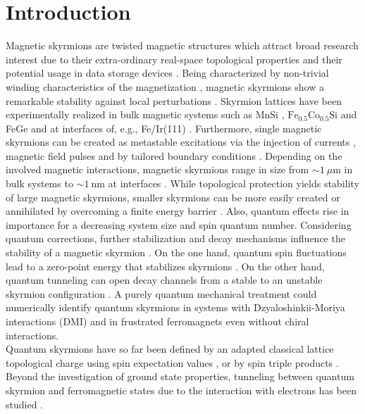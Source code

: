 \documentclass[reprint,aps,prb,superscriptaddress,10pt]{revtex4-2} %
\begin{document}
\section{Introduction}
Magnetic skyrmions \cite{Bogdanov1989} are twisted magnetic structures which attract broad research interest due to their extra-ordinary real-space topological properties \cite{Nagaosa2013} and their potential usage in data storage devices \cite{Kiselev2011,Fert2017,Back2020}.
Being characterized by non-trivial winding characteristics of the magnetization \cite{Nagaosa2013}, magnetic skyrmions show a remarkable stability against local perturbations \cite{Vedmedenko2019}. 
Skyrmion lattices have been experimentally realized in bulk magnetic systems such as MnSi \cite{Muhlbauer2009}, $\text{Fe}_{0.5}\text{Co}_{0.5}\text{Si}$ \cite{Yu2010} and FeGe \cite{Kotani2018} and at interfaces of, e.g., Fe/Ir(111) \cite{Romming2013,Hagemeister2016,Vedmedenko2020, Heinze2011}.
Furthermore, single magnetic skyrmions can be created as metastable excitations via the injection of currents \cite{Sampaio2013, Yuan2016, Stier2017}, magnetic field pulses \cite{Flovik2017} and by tailored  boundary conditions \cite{Schaffer2020,Raeliarijaona2018}.
Depending on the involved magnetic interactions, magnetic skyrmions range in size from $\sim1~\mu \text{m}$ in bulk systems to $\sim1~\text{nm}$ at interfaces \cite{Nagaosa2013,Romming2013,Heinze2011}. While topological protection yields stability of large magnetic skyrmions, smaller skyrmions can be more easily created or annihilated by overcoming a finite energy barrier \cite{Hagemeister2015,Siemens2016,CortesOrtuno2017}.
Also, quantum effects rise in importance for a decreasing system size and spin quantum number.
Considering quantum corrections, further stabilization and decay mechanisms influence the stability of a magnetic skyrmion \cite{RoldanMolina2015,DerrasChouk2018}. On the one hand,
quantum spin fluctuations lead to a zero-point energy that stabilizes skyrmions \cite{RoldanMolina2015}.
On the other hand, quantum tunneling can open decay channels from a stable to an unstable skyrmion configuration \cite{DerrasChouk2018}.
A purely quantum mechanical treatment could numerically identify quantum skyrmions in systems with Dzyaloshinkii-Moriya interactions (DMI) \cite{Sotnikov2021, Gauyacq2019a} and in frustrated ferromagnets \cite{Lohani2019a} even without chiral interactions.\\
Quantum skyrmions have so far been defined by an adapted classical lattice topological charge \cite{Berg1981} using spin expectation values \cite{Gauyacq2019a}, or by spin triple products  \cite{Sotnikov2021}. Beyond the investigation of ground state properties, tunneling between quantum skyrmion and ferromagnetic states due to the interaction with electrons has been studied \cite{Gauyacq2019a}.
\end{document}
